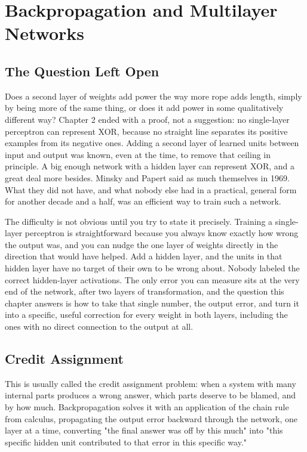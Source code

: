 \chapter{Backpropagation and Multilayer Networks}

\section*{The Question Left Open}

Does a second layer of weights add power the way more rope adds length, simply by being more of the same thing, or does it add power in some qualitatively different way? Chapter 2 ended with a proof, not a suggestion: no single-layer perceptron can represent XOR, because no straight line separates its positive examples from its negative ones. Adding a second layer of learned units between input and output was known, even at the time, to remove that ceiling in principle. A big enough network with a hidden layer can represent XOR, and a great deal more besides. Minsky and Papert said as much themselves in 1969. What they did not have, and what nobody else had in a practical, general form for another decade and a half, was an efficient way to train such a network.

The difficulty is not obvious until you try to state it precisely. Training a single-layer perceptron is straightforward because you always know exactly how wrong the output was, and you can nudge the one layer of weights directly in the direction that would have helped. Add a hidden layer, and the units in that hidden layer have no target of their own to be wrong about. Nobody labeled the correct hidden-layer activations. The only error you can measure sits at the very end of the network, after two layers of transformation, and the question this chapter answers is how to take that single number, the output error, and turn it into a specific, useful correction for every weight in both layers, including the ones with no direct connection to the output at all.

\section*{Credit Assignment}

This is usually called the credit assignment problem: when a system with many internal parts produces a wrong answer, which parts deserve to be blamed, and by how much. Backpropagation solves it with an application of the chain rule from calculus, propagating the output error backward through the network, one layer at a time, converting "the final answer was off by this much" into "this specific hidden unit contributed to that error in this specific way."

